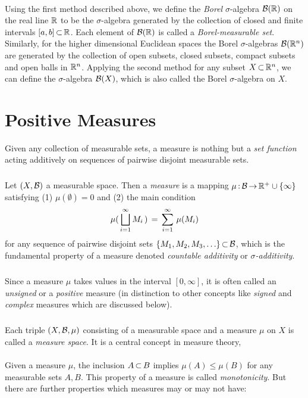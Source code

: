 \documentclass[11pt,twoside]{article}
\begin{document}
\paragraph*{}
Using the first method described above,
we define the \textit{Borel} $\sigma$-algebra $\cal{B}(\R)$
on the real line $\R$ to be the $\sigma$-algebra generated
by the collection of closed and finite intervals $[a,b] \xsubset \R$.
Each element of $\cal{B}(\R)$ is called a \textit{Borel-measurable set}.
Similarly,
for the higher dimensional Euclidean spaces
the Borel $\sigma$-algebras $\cal{B}(\Rn)$ are 
generated by the collection of open subsets, closed subsets,
compact subsets and open balls in $\Rn$.
Applying the second method for any subset $X \xsubset \Rn$,
we can define the $\sigma$-algebra $\cal{B}(X)$,
which is also called the Borel $\sigma$-algebra on $X$.

\section{Positive Measures}
Given any collection of measurable sets,
a measure is nothing but a \textit{set function} acting additively
on sequences of pairwise disjoint measurable sets.

\subparagraph{}
Let $(X,\salgB)$ a measurable space.
Then a \textit{measure} is a mapping
$\mu \: \salgB \xto \R^+ \cup \{\infty\}$
satisfying (1) $\mu(\emptyset)=0$ and (2) the main condition
\[
\mu (\, \bigsqcup_{i=1}^{\infty} M_i \,) \= \sum_{i=1}^{\infty} \, \mu(M_i)
\]
for any sequence of pairwise disjoint sets
$\{M_1,M_2,M_3, \ldots\} \xsubset \salgB$,
which is the fundamental property of a measure
denoted \textit{countable additivity} or \textit{$\sigma$-additivity}.

\subparagraph{}
Since a measure $\mu$ takes values in the interval $[0,\infty]$,
it is often called an \textit{unsigned} or a \textit{positive} measure
(in distinction to other concepts like 
\textit{signed} and \textit{complex} measures which are discussed below).

\subparagraph{}
Each triple $(X, \salgB, \mu)$ consisting of a measurable space
and a measure $\mu$ on $X$ is called a \textit{measure space}.
It is a central concept in measure theory,

\paragraph{}
Given a measure $\mu$,
the inclusion $A \xsubset B$ implies $\mu(A) \leq \mu(B)$
for any measurable sets $A,B$.
This property of a measure is called \textit{monotonicity}.
But there are further properties which measures may or may not have:
\end{document}
